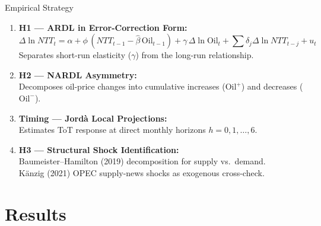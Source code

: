 \documentclass[10pt,aspectratio=169]{beamer}
\begin{document}
\begin{frame}{Empirical Strategy}
  \begin{enumerate}
    \item \textbf{H1 --- ARDL in Error-Correction Form:}
    \begin{equation*}
      \Delta \ln NTT_t = \alpha + \phi\, (NTT_{t-1} - \hat{\beta}\, \text{Oil}_{t-1}) + \gamma\, \Delta \ln \text{Oil}_t + \sum \delta_j \Delta \ln NTT_{t-j} + u_t
    \end{equation*}
    Separates short-run elasticity ($\gamma$) from the long-run relationship.

    \item \textbf{H2 --- NARDL Asymmetry:}\\
    Decomposes oil-price changes into cumulative increases ($\text{Oil}^+$) and decreases ($\text{Oil}^-$).

    \item \textbf{Timing --- Jord\`a Local Projections:}\\
    Estimates ToT response at direct monthly horizons $h = 0, 1, \ldots, 6$.

    \item \textbf{H3 --- Structural Shock Identification:}\\
    Baumeister--Hamilton (2019) decomposition for supply vs.\ demand.\\
    K\"anzig (2021) OPEC supply-news shocks as exogenous cross-check.
  \end{enumerate}
\end{frame}

\section{Results}
\end{document}
